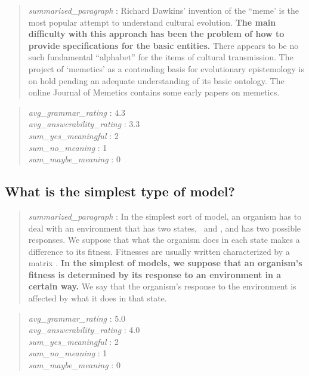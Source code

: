 \begin{quote}
\emph{summarized\_paragraph} : Richard Dawkins' invention of the ``meme'
is the most popular attempt to understand cultural evolution.
\textbf{The main difficulty with this approach has been the problem of
how to provide specifications for the basic entities.} There appears to
be no such fundamental ``alphabet'' for the items of cultural
transmission. The project of `memetics' as a contending basis for
evolutionary epistemology is on hold pending an adequate understanding
of its basic ontology. The online Journal of Memetics contains some
early papers on memetics.
\end{quote}

\begin{quote}
\emph{avg\_grammar\_rating} : 4.3\\
\emph{avg\_answerability\_rating} : 3.3\\
\emph{sum\_yes\_meaningful} : 2\\
\emph{sum\_no\_meaning} : 1\\
\emph{sum\_maybe\_meaning} : 0
\end{quote}

\hypertarget{what-is-the-simplest-type-of-model}{%
\subsection{What is the simplest type of
model?}\label{what-is-the-simplest-type-of-model}}

\begin{quote}
\emph{summarized\_paragraph} : In the simplest sort of model, an
organism has to deal with an environment that has two states, ~and , and
has two possible responses. We suppose that what the organism does in
each state makes a difference to its fitness. Fitnesses are usually
written characterized by a matrix . \textbf{In the simplest of models,
we suppose that an organism's fitness is determined by its response to
an environment in a certain way.} We say that the organism's response to
the environment is affected by what it does in that state.
\end{quote}

\begin{quote}
\emph{avg\_grammar\_rating} : 5.0\\
\emph{avg\_answerability\_rating} : 4.0\\
\emph{sum\_yes\_meaningful} : 2\\
\emph{sum\_no\_meaning} : 1\\
\emph{sum\_maybe\_meaning} : 0
\end{quote}

